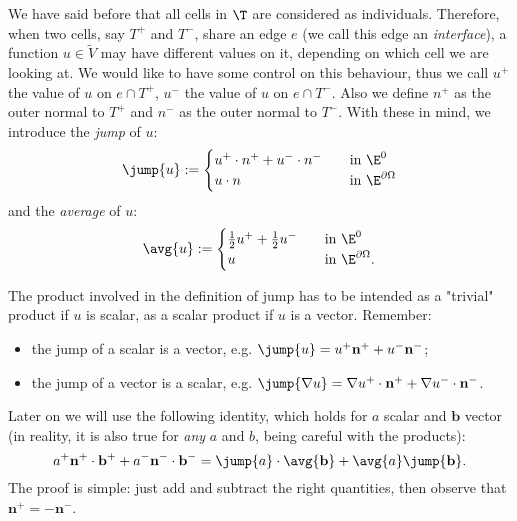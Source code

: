 We have said before that all cells in $\T$ are considered as individuals. Therefore, when two cells, say $T^+$ and $T^-$, share an edge $e$ (we call this edge an \emph{interface}), a function $u\in\tilde{V}$ may have different values on it, depending on which cell we are looking at. We would like to have some control on this behaviour, thus we call $u^+$ the value of $u$ on $e \cap T^+$, $u^-$ the value of $u$ on $e \cap T^-$. Also we define $n^+$ as the outer normal to $T^+$ and $n^-$ as the outer normal to $T^-$. With these in mind, we introduce the \emph{jump} of $u$:
\[
\jump{u} := \begin{cases}
u^+ \cdot n^+ + u^- \cdot n^- \quad &\text{in $\E^0$} \\
u \cdot n \quad &\text{in $\E^{\partial\Omega}$}
\end{cases}
\]
and the \emph{average} of $u$:
\[
\avg{u} := \begin{cases}
\frac{1}{2} u^+ + \frac{1}{2} u^-  \quad &\text{in $\E^0$} \\
u \quad &\text{in $\E^{\partial\Omega}$}.
\end{cases}
\]
\begin{remark}
The product involved in the definition of jump has to be intended as a "trivial" product if $u$ is scalar, as a scalar product if $u$ is a vector. Remember:
\begin{itemize}
    \item the jump of a scalar is a vector, e.g. $\jump{u} = u^+ \mathbf{n^+} + u^- \mathbf{n^-}$;
    \item the jump of a vector is a scalar, e.g. $\jump{\nabla u} = \nabla u^+ \cdot \mathbf{n^+} + \nabla u^- \cdot \mathbf{n^-}$.
\end{itemize}
Later on we will use the following identity, which holds for $a$ scalar and $\mathbf{b}$ vector (in reality, it is also true for \emph{any} $a$ and $b$, being careful with the products):
\begin{equation}\label{eqn:jump_avg}
a^+ \mathbf{n^+} \cdot \mathbf{b^+} + a^- \mathbf{n^-} \cdot \mathbf{b^-} = \jump{a} \cdot \avg{\mathbf{b}} + \avg{a} \jump{\mathbf{b}}.
\end{equation}
The proof is simple: just add and subtract the right quantities, then observe that $\mathbf{n^+}=-\mathbf{n^-}$.
\end{remark}

